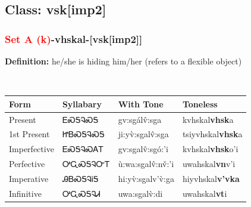 \subsection*{Class: vsk[imp2]}
\nopagebreak
\needspace{2in}
\subsubsection*{\textcolor{Red}{Set A (k)}{-}\textbf{vhskal}{-}[vsk[imp2]]}
\nopagebreak
\textbf{Definition: } he/she is hiding him/her (refers to a flexible object)
\\[0.5em]
\begin{tabularx}{\textwidth}{l X X X}%
\toprule%
\textbf{Form}&\textbf{Syllabary}&\textbf{With Tone}&\textbf{Toneless}\\%
\midrule%
Present&ᎬᏍᎦᎸᏍᎦ&gv:sgálv̂:sga&kvhskal\textbf{vhsk}a\\%
1st Present&ᏥᏴᏍᎦᎸᏍᎦ&ji:yv̀:sgalv̂:sga&tsiyvhskal\textbf{vhsk}a\\%
Imperfective&ᎬᏍᎦᎸᏍᎪᎢ&gv:sgalv̂:sgó:’i&kvhskal\textbf{vhsk}o'i\\%
Perfective&ᎤᏩᏍᎦᎸᏅᎢ&ù:wa:sgalv̂:nv̌:’i&uwahskal\textbf{vn}v'i\\%
Imperative&ᎯᏴᏍᎦᎸᎥᎦ&hi:yv̀:sgalv’v̀:ga&hiyvhskal\textbf{v'vka}\\%
Infinitive&ᎤᏩᏍᎦᎸᏗ&uwa:sgalv̀:di&uwahskal\textbf{vt}i\\%
\bottomrule%
\end{tabularx}
\\[1em]